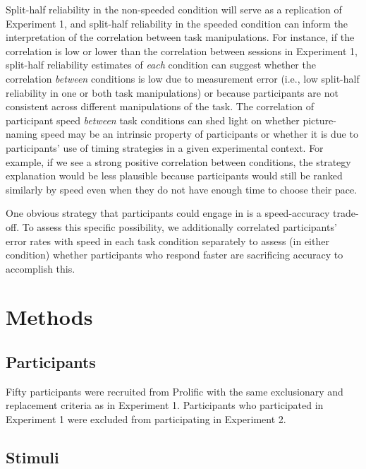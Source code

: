 \documentclass[
  man,floatsintext]{apa6}
\begin{document}
Split-half reliability in the non-speeded condition will serve as a replication of Experiment 1, and split-half reliability in the speeded condition can inform the interpretation of the correlation between task manipulations. For instance, if the correlation is low or lower than the correlation between sessions in Experiment 1, split-half reliability estimates of \emph{each} condition can suggest whether the correlation \emph{between} conditions is low due to measurement error (i.e., low split-half reliability in one or both task manipulations) or because participants are not consistent across different manipulations of the task. The correlation of participant speed \emph{between} task conditions can shed light on whether picture-naming speed may be an intrinsic property of participants or whether it is due to participants' use of timing strategies in a given experimental context. For example, if we see a strong positive correlation between conditions, the strategy explanation would be less plausible because participants would still be ranked similarly by speed even when they do not have enough time to choose their pace.

One obvious strategy that participants could engage in is a speed-accuracy trade-off. To assess this specific possibility, we additionally correlated participants' error rates with speed in each task condition separately to assess (in either condition) whether participants who respond faster are sacrificing accuracy to accomplish this.

\hypertarget{methods-1}{%
\section{Methods}\label{methods-1}}

\hypertarget{participants-1}{%
\subsection{Participants}\label{participants-1}}

Fifty participants were recruited from Prolific with the same exclusionary and replacement criteria as in Experiment 1. Participants who participated in Experiment 1 were excluded from participating in Experiment 2.

\hypertarget{stimuli-1}{%
\subsection{Stimuli}\label{stimuli-1}}
\end{document}
